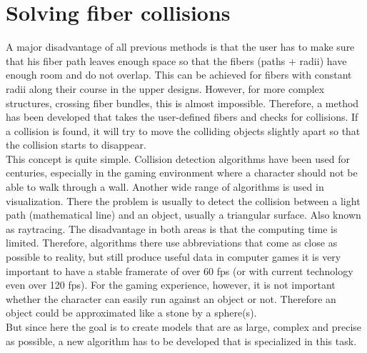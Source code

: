 \section{Solving fiber collisions}
\label{sec:Solver}
% 
A major disadvantage of all previous methods is that the user has to make sure that his fiber path leaves enough space so that the fibers (paths + radii) have enough room and do not overlap.
This can be achieved for fibers with constant radii along their course in the upper designs.
However, for more complex structures, \eg crossing fiber bundles, this is almost impossible.
Therefore, a method has been developed that takes the user-defined fibers and checks for collisions.
If a collision is found, it will try to move the colliding objects slightly apart so that the collision starts to disappear.
\\
% 
This concept is quite simple.
Collision detection algorithms have been used for centuries, especially in the gaming environment where \eg a character should not be able to walk through a wall.
Another wide range of algorithms is used in visualization.
There the problem is usually to detect the collision between a light path (mathematical line) and an object, usually a triangular surface.
Also known as raytracing.
The disadvantage in both areas is that the computing time is limited.
Therefore, algorithms there use abbreviations that come as close as possible to reality, but still produce useful data \eg in computer games it is very important to have a stable framerate of over $\num{60}$ \ac{fps} (or with current technology even over 120 \ac{fps}).
For the gaming experience, however, it is not important whether the character can easily run against an object or not.
Therefore an object could be approximated like a stone by a sphere(s).
\\
%
But since here the goal is to create models that are as large, complex and precise as possible, a new algorithm has to be developed that is specialized in this task.
% 
\\[\baselineskip]
%
